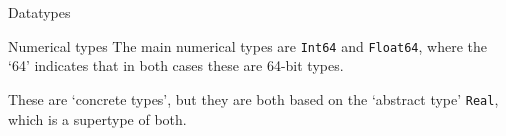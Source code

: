 \begin{comment}
\begin{block}{Terminal input}
  \label{sl:cin}
  To make a program run dynamic, you can set starting values from
  keyboard input. For this, use \indextermtt{cin}, which takes
  keyboard input and puts it in a numerical (or string) variable.
  \begin{lstlisting}
    // add at the top of your program:
    using std::cin;

    // then in your main:
    int i;
    cin >> i;
  \end{lstlisting}
\end{block}
\end{comment}

 {Datatypes}
\label{sec:jtypes}

\begin{block}{Numerical types}
  The main numerical types are \lstinline{Int64} and \lstinline{Float64},
  where the `64' indicates that in both cases these are 64-bit types.

  These are `concrete types', but they are both based on the `abstract
  type' \lstinline{Real}, which is a supertype of both.
\end{block}

